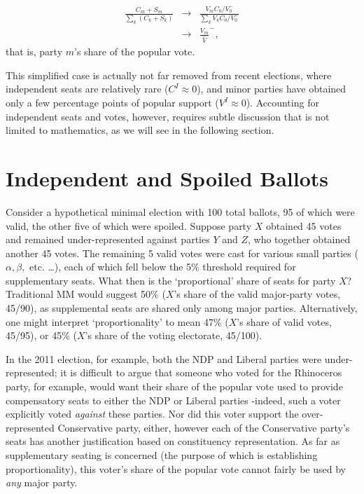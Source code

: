 \begin{align}
\label{eq:seatshare}
\frac{C_m+S_m}{ \sum\limits_k\left( C_k+S_k \right)} &\to& \frac{V_m C_0/V_0^-}{ \sum\limits_k V_k C_0/V_0^-} \\
&\to& \frac{V_m}{\hat{V}}^-,
\end{align}
that is, party $m$'s share of the popular vote.

This simplified case is actually not far removed from recent elections, where independent seats are relatively rare ($C^I\approx0$), and minor parties have obtained only a few percentage points of popular support ($V^I \approx 0$).
Accounting for independent seats and votes, however, requires subtle discussion that is not limited to mathematics, as we will see in the following section.


\section{Independent and Spoiled Ballots}
\label{sec:outliers}
Consider a hypothetical minimal election with 100 total ballots, 95 of which were valid, the other five of which were spoiled. Suppose party $X$ obtained 45 votes and remained under-represented against parties $Y$ and $Z$, who together obtained another 45 votes. The remaining 5 valid votes were cast for various small parties ($\alpha,\beta,$ etc. \ldots), each of which fell below the 5\% threshold required for supplementary seats.
What then is the `proportional' share of seats for party $X$?
Traditional MM would suggest 50\% ($X$'s share of the valid major-party votes, 45/90), as supplemental seats are shared only among major parties. Alternatively, one might interpret `proportionality' to mean 47\% ($X$'s share of valid votes, 45/95), or 45\% ($X$'s share of the voting electorate, 45/100).


In the 2011 election, for example, both the NDP and Liberal parties were under-represented; it is difficult to argue that someone who voted for the Rhinoceros party, for example, would want their share of the popular vote used to provide compensatory seats to either the NDP or Liberal parties \--indeed, such a voter explicitly voted \emph{against} these parties.
Nor did this voter support the over-represented Conservative party, either, however each of the Conservative party’s seats has another justification based on constituency representation.
As far as supplementary seating is concerned (the purpose of which is establishing proportionality), this voter’s share of the popular vote cannot fairly be used by \emph{any} major party.

